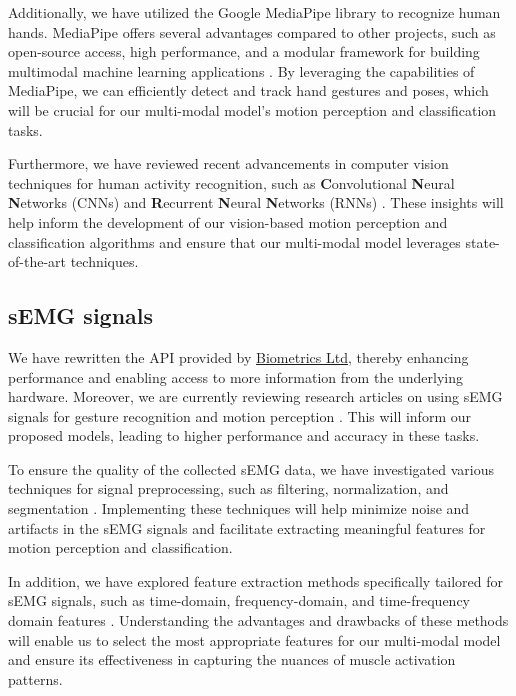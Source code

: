 \documentclass[12pt, a4paper]{article}
\begin{document}
Additionally, we have utilized the Google MediaPipe library to recognize human hands. MediaPipe offers several advantages compared to other projects, such as open-source access, high performance, and a modular framework for building multimodal machine learning applications \cite{lugaresi2019mediapipe}. By leveraging the capabilities of MediaPipe, we can efficiently detect and track hand gestures and poses, which will be crucial for our multi-modal model's motion perception and classification tasks.

Furthermore, we have reviewed recent advancements in computer vision techniques for human activity recognition, such as \textbf{C}onvolutional \textbf{N}eural \textbf{N}etworks (CNNs) and \textbf{R}ecurrent \textbf{N}eural \textbf{N}etworks (RNNs) \cite{tran2015deep}. These insights will help inform the development of our vision-based motion perception and classification algorithms and ensure that our multi-modal model leverages state-of-the-art techniques.

\subsection{sEMG signals}
We have rewritten the API provided by \href{https://www.biometricsltd.com/}{Biometrics Ltd}, thereby enhancing performance and enabling access to more information from the underlying hardware. Moreover, we are currently reviewing research articles on using sEMG signals for gesture recognition and motion perception \cite{phinyomark2018usefulness}. This will inform our proposed models, leading to higher performance and accuracy in these tasks.

To ensure the quality of the collected sEMG data, we have investigated various techniques for signal preprocessing, such as filtering, normalization, and segmentation \cite{al-timemy2016classification}. Implementing these techniques will help minimize noise and artifacts in the sEMG signals and facilitate extracting meaningful features for motion perception and classification.

In addition, we have explored feature extraction methods specifically tailored for sEMG signals, such as time-domain, frequency-domain, and time-frequency domain features \cite{tuncer2020surface}. Understanding the advantages and drawbacks of these methods will enable us to select the most appropriate features for our multi-modal model and ensure its effectiveness in capturing the nuances of muscle activation patterns.
\end{document}
